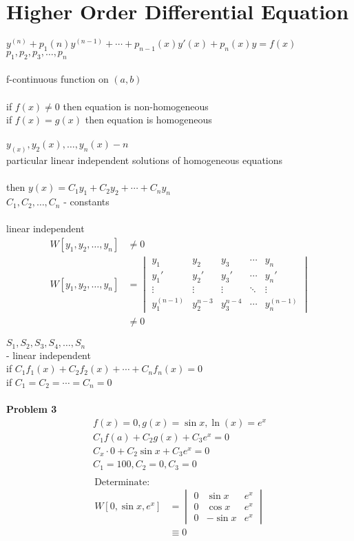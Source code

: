 \documentclass[10pt, letterpaper]{article}
\begin{document}
\section{Higher Order Differential Equation}
$y^{(n)} +p_1(n)y^{(n-1)} +\cdots +p_{n-1}(x)y'(x) +p_n(x)y =f(x)$\\
$p_1, p_2, p_3, \dots, p_n$\\
\\
f-continuous function on $(a, b)$\\
\\
if $f(x) \neq 0$ then equation is non-homogeneous\\
if $f(x) = g(x)$ then equation is homogeneous\\
\\
$y_(x), y_2(x), \dots, y_n(x) -n$\\
particular linear independent solutions of homogeneous equations\\
\\
then $y(x) =C_1y_1 +C_2y_2 +\cdots +C_ny_n$\\
$C_1, C_2, \dots, C_n$ - constants\\
\\
linear independent\\
\begin{align*}
W[y_1, y_2, \dots, y_n] &\neq 0\\
W[y_1, y_2, \dots, y_n] &=
\begin{vmatrix}
y_1 & y_2 & y_3 & \cdots & y_n\\
y_1' & y_2' & y_3' & \cdots & y_n'\\
\vdots & \vdots & \vdots & \ddots & \vdots\\
y_1^{(n-1)} & y_2^{n-3} & y_3^{n-4} & \cdots & y_n^{(n-1)}
\end{vmatrix}\\
&\neq 0
\end{align*}

$S_1, S_2, S_3, S_4, \dots, S_n$\\
- linear independent\\
if $C_1f_1(x) +C_2f_2(x) +\cdots +C_nf_n(x) =0$\\
if $C_1 =C_2 =\cdots =C_n =0$\\
\\
\textbf{Problem 3}\\
\begin{align*}
f(x) =0, g(x) =\sin x, \ln(x) =e^x\\
C_1f(a) +C_2g(x) +C_3e^x =0\\
C_x \cdot 0 +C_2 \sin x + C_3 e^x =0\\
C_1=100, C_2=0, C_3=0\\
\end{align*}
\begin{align*}
\text{Determinate: }\\
W[0, \sin x, e^x] &=
\begin{vmatrix}
0 & \sin x & e^x\\
0 & \cos x & e^x\\
0 & -\sin x & e^x
\end{vmatrix}\\
&\equiv 0
\end{align*}
\end{document}
